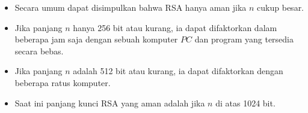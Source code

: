 \documentclass{article}
\begin{document}

\begin{itemize}
    \item Secara umum dapat disimpulkan bahwa RSA hanya aman jika $n$ cukup besar.
    \item Jika panjang $n$ hanya 256 bit atau kurang, ia dapat difaktorkan dalam beberapa jam saja dengan sebuah komputer $PC$ dan program yang tersedia secara bebas.
    \item Jika panjang $n$ adalah 512 bit atau kurang, ia dapat difaktorkan dengan beberapa ratus komputer.
    \item Saat ini panjang kunci RSA yang aman adalah jika $n$ di atas 1024 bit.
\end{itemize}
\end{document}

